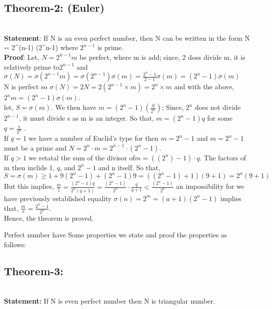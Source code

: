 \documentclass[12pt,,a4paper]{article}
\begin{document}
\subsection*{Theorem-2: (Euler)} \\
\textbf{Statement}: If N is an even perfect number, then N
can be written in the form N = 2^{(n-1)} (2^n-1) where  \(2^{n-1}\) is prime. \\ \vspace{10pt}
\textbf{Proof}: Let, \(N = 2^{n-1}m\) be perfect, where m is add; since, 2  does divide m, it is relatively prime to\(2^{n-1}\) and  \(\sigma(N) = \sigma(2^{n-1}m) = \sigma(2^{n-1})\sigma(m) = \frac{{2^n-1}}{{2-1}} \sigma(m) = (2^n-1) \sigma(m)\)  \\
 N is perfect so \(\sigma(N) = 2N = 2(2^{n-1} \times m) = 2^n \times m\) and with the above, 
\(2^n m = (2^n-1) \sigma (m)\). \\
let, \(S=\sigma(m)\). We then have \(m=(2^n-1) \left(\frac{S}{2^n}\right)\); Since, \(2^n\) does not divide \(2^{n-1}\), it must divide s as m is an integer. So that, \(m = (2^n-1)q\) for some \(q = \frac{s}{2^n}\) . \\
If \(q = 1\) we have a number of Euclid's type for then \(m = 2^n - 1\) and \(m = 2^n - 1\) must be a prime and \(N = 2^n \cdot m = 2^{n-1} \cdot (2^n-1)\). \\
 If \(q > 1\) we retatal the sum of the divisor of\(m = ((2^n) - 1) \cdot q\). The factors of m then inclide 1, \(q\), and \(2^n - 1\) and n itself. So that, \\
 \(S = \sigma(m) \geq 1 + 9(2^n-1)+(2^n-1)9 =((2^n-1) +1)(9+1) = 2^n(9+1)\)\\
 But this implies, 
\(\frac{m}{5} = \frac{(2^n-1)q}{2^n(q+1)} = \frac{(2^n -1)}{2^n} \cdot \frac{q}{q+1} < \frac{(2^n -1)}{2^n}\) an impossibility  for we have  previously established equality \(\sigma(n) = 2^m = (a+1)(2^n-1)\) implies that, \(\frac{m}{s} = \frac{2^n-1}{2^n}\). \\ Hence, the theorem is proved. \\ 
\vspace{10pt}

Perfect number have Some properties we state and proof the properties as follows: \\
\vspace{10pt}
\subsection*{Theorem-3:}\\
 \textbf{Statement:} If N is even perfect number then N is triangular number.
 
\end{document}

